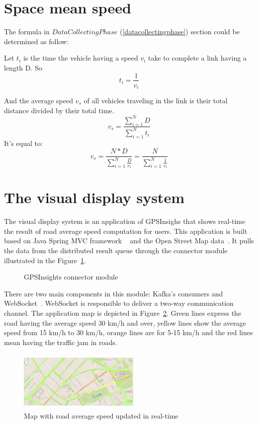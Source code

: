 \documentclass{acm_proc_article-sp}
\begin{document}
\section{Space mean speed}
The formula in $Data Collecting Phase$ (\ref{datacollectingphase}) section could be determined as follow:

Let $t_{i}$ is the time the vehicle having a speed $v_{i}$ take to complete a link having a length D. So
	\[ t_{i} = \frac{1}{v_{i}} \] 

And the average speed $v_{s}$ of all vehicles traveling in the link is their total distance divided by their total time.
	\[v_{s} = \frac{\sum_{i=1}^{N} D}{\sum_{i=1}^{N} t_{i}}\]
It's equal to:
	\[v_{s} = \frac{N \ast D}{\sum_{i=1}^{N} \frac{D}{v_{i}}} = \frac{N}{\sum_{i=1}^{N}\frac{1}{v_{i}}} \]

\section{The visual display system}

The visual display system is an application of GPSInsighs that shows real-time the result of road average speed computation for users. This application is built based on Java Spring MVC framework ~\cite{javaspringmvc} and the Open Street Map data~\cite{openstreetmap}. It pulls the data from the distributed result queue through the connector module illustrated in the Figure~\ref{fig:connectmodule}.

\begin{figure}[h]
	\centering
	\caption{GPSInsights connector module}
	\label{fig:connectmodule}
\end{figure}

There are two main components in this module: Kafka's consumers and WebSocket~\cite{websocket}. WebSocket is responsible to deliver a two-way communication channel. The application map is depicted in Figure~\ref{fig:app}. Green lines express the road having the average speed 30 km/h and over, yellow lines show the average speed from 15 km/h to 30 km/h, orange lines are for 5-15 km/h and the red lines mean having the traffic jam in roads. 

	\begin{figure}[h]
		\centering
		\includegraphics[height=110px,width=220px]{Picture1}
		\caption{Map with road average speed updated in real-time}
		\label{fig:app}
	\end{figure}
\end{document}
